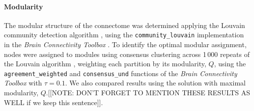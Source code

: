 \documentclass[10pt,letterpaper]{article}
\begin{document}
\paragraph{Modularity}
The modular structure of the connectome was determined applying the Louvain community detection algorithm \cite{Blondel:2008do}, using the \texttt{community\_louvain} implementation in the \emph{Brain Connectivity Toolbox} \cite{Rubinov2010}.
To identify the optimal modular assignment, nodes were assigned to modules using consensus clustering across 1\,000 repeats of the Louvain algorithm \cite{Lancichinetti2012}, weighting each partition by its modularity, $Q$, using the \texttt{agreement\_weighted} and \texttt{consensus\_und} functions of the \emph{Brain Connectivity Toolbox} \cite{Rubinov2010} with $\tau = 0.1$.
We also compared results using the solution with maximal modularity, $Q$.[[NOTE: DON'T FORGET TO MENTION THESE RESULTS AS WELL if we keep this sentence]]. 



\end{document}
